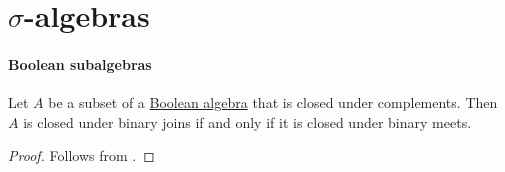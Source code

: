 \section[σ-algebras]{\( \sigma \)-algebras}\label{sec:sigma_algebras}

\paragraph{Boolean subalgebras}

\begin{lemma}\label{thm:boolean_subalgebra_binary_de_morgan}
  Let \( A \) be a subset of a \hyperref[def:boolean_algebra]{Boolean algebra} that is closed under complements. Then \( A \) is closed under binary joins if and only if it is closed under binary meets.
\end{lemma}
\begin{proof}
  Follows from .
\end{proof}

